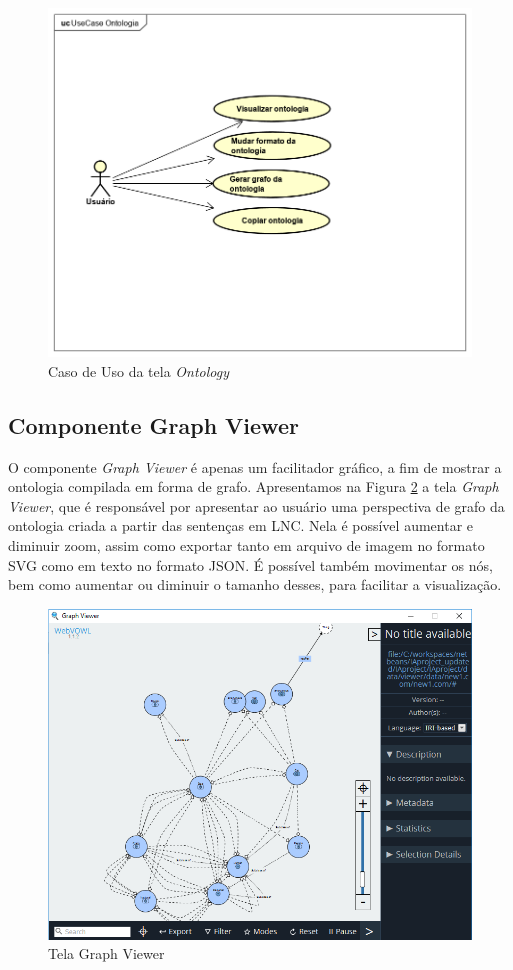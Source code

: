 \documentclass{bcc}
\begin{document}
\begin{figure}[H]
\centering
\includegraphics[width=.6\textwidth]{Figuras/UseCaseOntologia.png}
\caption{Caso de Uso da tela \textit{Ontology}} 
\label{fig:ucontology}
\end{figure}

\subsection{Componente Graph Viewer}

O componente \textit{Graph Viewer} é apenas um facilitador gráfico, a fim de mostrar a ontologia compilada em forma de grafo. Apresentamos na Figura \ref{fig:telGraph} a tela \textit{Graph Viewer}, que é responsável por apresentar ao usuário uma perspectiva de grafo da ontologia criada a partir das sentenças em LNC. Nela é possível aumentar e diminuir zoom, assim como exportar tanto em arquivo de imagem no formato SVG como em texto no formato JSON. É possível também movimentar os nós, bem como aumentar ou diminuir o tamanho desses, para facilitar a visualização. 

\begin{figure}[H]
\centering
\includegraphics[width=.7\textwidth]{Figuras/tela_graph.png}
\caption{Tela Graph Viewer}
\label{fig:telGraph}
\end{figure}
\end{document}
